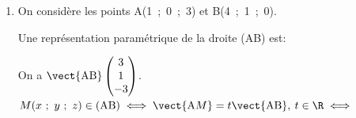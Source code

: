 
\medskip

%
%
%
%

\begin{enumerate}
\item On considère les points A(1~;~0~;~3) et B(4~;~1~;~0).

Une représentation paramétrique de la droite (AB) est:


On a $\vect{\text{AB}}\begin{pmatrix}3\\1\\-3\end{pmatrix}$.
$M(x~;~y~;~z) \in (\text{AB}) \iff \vect{\text{A}M} = t\vect{\text{AB}}, \: t \in \R \iff $


\end{enumerate}
